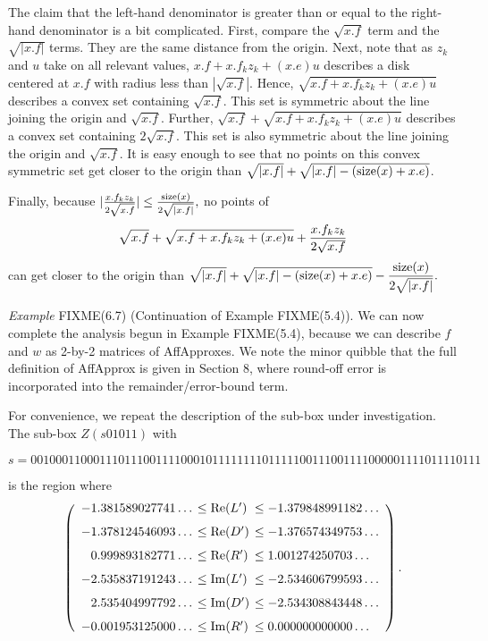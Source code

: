 The claim that the left-hand denominator is greater than or equal to the right-hand denominator is a bit complicated.  First, compare the $\sqrt{x.f}$ term and the $\sqrt{|x.f|}$ terms.  They are the same distance from the origin.  Next, note that as $z_k$ and $u$ take on all
relevant values, $x.f + x.f_k z_k + (x.e) u$ describes a disk centered at $x.f$
with radius   less than $ |\sqrt {x.f}|$.  Hence, $\sqrt {x.f + x.f_k z_k + (x.e) u}$ describes a convex set containing $\sqrt{x.f}$.  This set
is symmetric about the line joining the origin and $\sqrt{x.f}$. Further, $\sqrt{x.f} + \sqrt {x.f + x.f_k z_k + (x.e) u}$ describes a convex
set containing $2 \sqrt{x.f}$.   This set is also symmetric about the line joining the origin and  $\sqrt{x.f}$.
It is easy enough to see that no points on this convex symmetric set get closer to the origin than $\sqrt{|x.f|}  + \sqrt {|x.f| - ({\rm size}(x) + x.e)}$.

Finally, because $|{x.f_k z_k \over 2 \sqrt{x.f}}| \le {{\rm size}(x) \over 2 \sqrt {|x.f|}},$ no points of $$\sqrt {x.f} + \sqrt {x.f + x.f_k z_k + (x.e) u} + 
{x.f_k z_k \over 2 \sqrt{x.f}}$$
can get closer to the origin than
\hfill ${\displaystyle \sqrt{|x.f|} + \sqrt {|x.f| - ({\rm size}(x) + x.e)} - 
{{\rm size}(x) \over 2 \sqrt {|x.f|}}.} $ \enddemo

{\it Example} FIXME(6.7) (Continuation of Example FIXME(5.4)).
We can now complete the analysis begun in Example FIXME(5.4),
because we can describe $f$ and $w$ as 2-by-2 matrices of AffApproxes.
We note the minor quibble that the full definition of AffApprox is
given in Section 8, where round-off error is incorporated into
the remainder/error-bound term.

For convenience,
we repeat the description of the sub-box under investigation.
The sub-box $Z(s01011)$ with  
\begin{small}
$$s = 001000110001110111001111000101111111101111100111001111000001111011110111$$ 
\end{small}%

\noindent is the region where
$$\left(\begin{array}{rll}
-1.381589027741\ldots &\hskip-6pt \le  {\rm Re}(L')&  \hskip-6pt\le  -1.379848991182\ldots\\[7pt]
-1.378124546093\ldots &\hskip-6pt \le  {\rm Re}(D')&\hskip-6pt  \le  -1.376574349753\ldots\\[7pt]
0.999893182771\ldots  &\hskip-6pt\le {\rm Re}(R')& \hskip-6pt  \le  1.001274250703\ldots\\[7pt]
-2.535837191243\ldots &\hskip-6pt \le  {\rm Im}(L')&\hskip-6pt  \le  -2.534606799593\ldots\\[7pt]
2.535404997792\ldots & \hskip-6pt\le  {\rm Im}(D') &\hskip-6pt \le  -2.534308843448\ldots\\[7pt]
-0.001953125000\ldots &\hskip-6pt \le {\rm  Im}(R')&\hskip-6pt  \le  0.000000000000\ldots
\end{array}\right).$$ 

